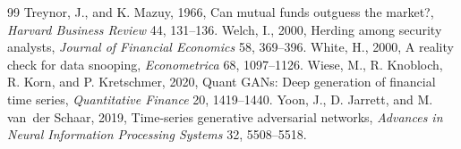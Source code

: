 \begin{thebibliography}{99}
 Treynor, J., and K. Mazuy, 1966, Can mutual funds outguess the market?, \emph{Harvard Business Review} 44, 131--136.
 Welch, I., 2000, Herding among security analysts, \emph{Journal of Financial Economics} 58, 369--396.
 White, H., 2000, A reality check for data snooping, \emph{Econometrica} 68, 1097--1126.
 Wiese, M., R. Knobloch, R. Korn, and P. Kretschmer, 2020, Quant GANs: Deep generation of financial time series, \emph{Quantitative Finance} 20, 1419--1440.
 Yoon, J., D. Jarrett, and M. van~der Schaar, 2019, Time-series generative adversarial networks, \emph{Advances in Neural Information Processing Systems} 32, 5508--5518.
\end{thebibliography}
